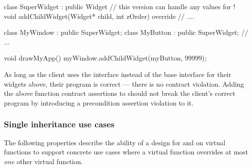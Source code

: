 \begin{codeblock}
class SuperWidget : public Widget {
  // this version can handle any values for !
  void addChildWidget(Widget* child, int zOrder) override {
    // ....
  } 
}

class MyWindow : public SuperWidget;
class MyButton : public SuperWidget;
// ...

void drawMyApp() {
  myWindow.addChildWidget(myButton, 99999);
}
\end{codeblock}
As long as the client uses the  interface instead of the base  interface for their widgets above, their program is correct --- there is no contract violation. Adding the above function contract assertions to \allowbreak{} should not break the client's correct program by introducing a precondition assertion violation to it.


\subsubsection{Single inheritance use cases}

The following properties describe the ability of a design  for  and  on virtual functions to support concrete use cases where a virtual function overrides at most \emph{one} other virtual function.


